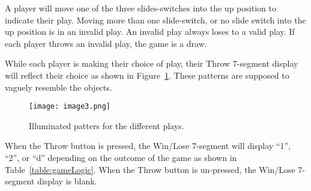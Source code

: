 A player will move one of the three slides-switches into the up position
to indicate their play. Moving more than one slide-switch, or no slide
switch into the up position is in an invalid play. An invalid play
always loses to a valid play. If each player throws an invalid play, the
game is a draw.

While each player is making their choice of play, their Throw 7-segment
display will reflect their choice as shown in Figure~\ref{figure:play7seg}. These patterns
are supposed to vaguely resemble the objects.

\begin{figure}[ht]
\texttt{[image: image3.png]}
\caption{Illuminated patters for the different plays.}
\label{figure:play7seg}
\end{figure}

When the Throw button is pressed, the Win/Lose 7-segment will display
``1'', ``2'', or ``d'' depending on the outcome of the game as shown in
Table~\ref{table:gameLogic}. When the Throw button is un-pressed, the Win/Lose 7-segment
display is blank.

